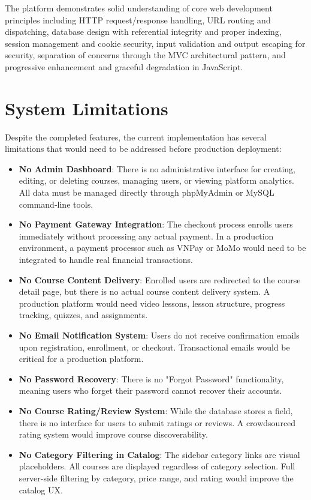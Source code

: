 \documentclass[12pt,a4paper]{report}
\begin{document}
The platform demonstrates solid understanding of core web development principles including HTTP request/response handling, URL routing and dispatching, database design with referential integrity and proper indexing, session management and cookie security, input validation and output escaping for security, separation of concerns through the MVC architectural pattern, and progressive enhancement and graceful degradation in JavaScript.

\section{System Limitations}

Despite the completed features, the current implementation has several limitations that would need to be addressed before production deployment:

\begin{itemize}
    \item \textbf{No Admin Dashboard}: There is no administrative interface for creating, editing, or deleting courses, managing users, or viewing platform analytics. All data must be managed directly through phpMyAdmin or MySQL command-line tools.
    
    \item \textbf{No Payment Gateway Integration}: The checkout process enrolls users immediately without processing any actual payment. In a production environment, a payment processor such as VNPay or MoMo would need to be integrated to handle real financial transactions.
    
    \item \textbf{No Course Content Delivery}: Enrolled users are redirected to the course detail page, but there is no actual course content delivery system. A production platform would need video lessons, lesson structure, progress tracking, quizzes, and assignments.
    
    \item \textbf{No Email Notification System}: Users do not receive confirmation emails upon registration, enrollment, or checkout. Transactional emails would be critical for a production platform.
    
    \item \textbf{No Password Recovery}: There is no "Forgot Password" functionality, meaning users who forget their password cannot recover their accounts.
    
    \item \textbf{No Course Rating/Review System}: While the database stores a  field, there is no interface for users to submit ratings or reviews. A crowdsourced rating system would improve course discoverability.
    
    \item \textbf{No Category Filtering in Catalog}: The sidebar category links are visual placeholders. All courses are displayed regardless of category selection. Full server-side filtering by category, price range, and rating would improve the catalog UX.
\end{itemize}
\end{document}
